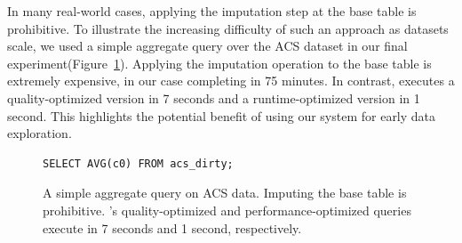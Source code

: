 In many real-world cases, applying the imputation step at the base table is prohibitive.
To illustrate the increasing difficulty of such an approach as datasets scale, we used a simple
aggregate query over the ACS dataset in our final experiment(Figure~\ref{query-acs}).
Applying the imputation operation to the base table is extremely expensive, in our case
completing in 75 minutes. In contrast, \ProjectName{} executes a quality-optimized version
in 7 seconds and a runtime-optimized version in 1 second. This highlights the potential
benefit of using our system for early data exploration.

\begin{figure}
\begin{lstlisting}
SELECT AVG(c0) FROM acs_dirty;
\end{lstlisting}
\caption{A simple aggregate query on ACS data. Imputing the base table is prohibitive.
    \ProjectName's quality-optimized and performance-optimized queries execute in 7 seconds
    and 1 second, respectively.
}
\label{query-acs}
\end{figure}


